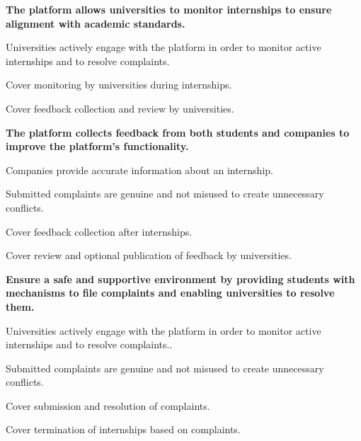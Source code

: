 \begin{enumerate}[label={\textbf{[G\arabic*]}}]
    \item \textbf{The platform allows universities to monitor internships to ensure alignment with academic standards.}
    \begin{enumerate}[label={\textbf{[D\arabic*]}}]
        \item[\textbf{[D3]}] Universities actively engage with the platform in order to monitor active internships and to resolve complaints.
    \end{enumerate}
    \begin{enumerate}[label={\textbf{[D\arabic*]}}]
         \item[\textbf{[FR33]}] Cover monitoring by universities during internships.
         \item[\textbf{[FR34, FR35]}] Cover feedback collection and review by universities.
    \end{enumerate}
    
    \item \textbf{The platform collects feedback from both students and companies to improve the platform’s functionality.}
    \begin{enumerate}[label={\textbf{[D\arabic*]}}]
        \item[\textbf{[D4]}] Companies provide accurate information about an internship.
        \item[\textbf{[D6]}] Submitted complaints are genuine and not misused to create unnecessary conflicts.
    \end{enumerate}
    \begin{enumerate}[label={\textbf{[D\arabic*]}}]
         \item[\textbf{[FR36,FR37]}] Cover feedback collection after internships.
         \item[\textbf{[FR38]}] Cover review and optional publication of feedback by universities.
    \end{enumerate}
    
    \item \textbf{Ensure a safe and supportive environment by providing students with mechanisms to file complaints and enabling universities to resolve them.}
    \begin{enumerate}[label={\textbf{[D\arabic*]}}]
        \item[\textbf{[D3]}] Universities actively engage with the platform in order to monitor active internships and to resolve complaints..
        \item[\textbf{[D6]}] Submitted complaints are genuine and not misused to create unnecessary conflicts.
    \end{enumerate}
    \begin{enumerate}[label={\textbf{[D\arabic*]}}]
         \item[\textbf{[FR33,FR34]}] Cover submission and resolution of complaints.
         \item[\textbf{[FR35]}] Cover termination of internships based on complaints.
    \end{enumerate}
    
\end{enumerate}